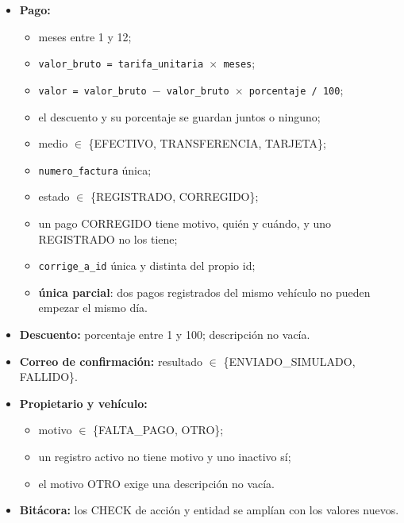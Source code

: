 \begin{itemize}
  \item \textbf{Pago:}
  \begin{itemize}\item meses entre 1 y 12;\end{itemize}
  \begin{itemize}\item \texttt{valor\_bruto = tarifa\_unitaria $\times$ meses};\end{itemize}
  \begin{itemize}\item \texttt{valor = valor\_bruto $-$ valor\_bruto $\times$ porcentaje / 100};\end{itemize}
  \begin{itemize}\item el descuento y su porcentaje se guardan juntos o ninguno;\end{itemize}
  \begin{itemize}\item medio $\in$ \{EFECTIVO, TRANSFERENCIA, TARJETA\};\end{itemize}
  \begin{itemize}\item \texttt{numero\_factura} única;\end{itemize}
  \begin{itemize}\item estado $\in$ \{REGISTRADO, CORREGIDO\};\end{itemize}
  \begin{itemize}\item un pago CORREGIDO tiene motivo, quién y cuándo, y uno REGISTRADO no los tiene;\end{itemize}
  \begin{itemize}\item \texttt{corrige\_a\_id} única y distinta del propio id;\end{itemize}
  \begin{itemize}\item \textbf{única parcial}: dos pagos registrados del mismo vehículo no pueden empezar el mismo día.\end{itemize}
  \item \textbf{Descuento:} porcentaje entre 1 y 100; descripción no vacía.
  \item \textbf{Correo de confirmación:} resultado $\in$ \{ENVIADO\_SIMULADO, FALLIDO\}.
  \item \textbf{Propietario y vehículo:}
  \begin{itemize}\item motivo $\in$ \{FALTA\_PAGO, OTRO\};\end{itemize}
  \begin{itemize}\item un registro activo no tiene motivo y uno inactivo sí;\end{itemize}
  \begin{itemize}\item el motivo OTRO exige una descripción no vacía.\end{itemize}
  \item \textbf{Bitácora:} los CHECK de acción y entidad se amplían con los valores nuevos.
\end{itemize}

